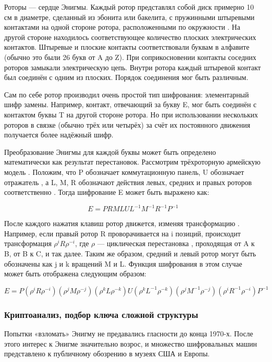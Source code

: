 Роторы — сердце Энигмы. Каждый ротор представлял собой диск примерно 
10 см в диаметре, сделанный из эбонита или бакелита, с пружинными 
штыревыми контактами на одной стороне ротора, расположенными по окружности
. На другой стороне находилось соответствующее количество плоских 
электрических контактов. Штыревые и плоские контакты соответствовали 
буквам в алфавите (обычно это были 26 букв от A до Z). При соприкосновении 
контакты соседних роторов замыкали электрическую цепь. Внутри ротора 
каждый штыревой контакт был соединён с одним из плоских. Порядок соединения 
мог быть различным.

Сам по себе ротор производил очень простой тип шифрования: элементарный 
шифр замены. Например, контакт, отвечающий за букву E, мог быть соединён 
с контактом буквы T на другой стороне ротора. Но при использовании 
нескольких роторов в связке (обычно трёх или четырёх) за счёт их постоянного 
движения получается более надёжный шифр.

Преобразование Энигмы для каждой буквы может быть определено математически 
как результат перестановок. Рассмотрим трёхроторную армейскую модель
. Положим, что P обозначает коммутационную панель, U обозначает отражатель
, а L, M, R обозначают действия левых, средних и правых роторов соответственно
. Тогда шифрование E может быть выражено как:

    $$E = PRMLUL^{-1}M^{-1}R^{-1}P^{-1}$$

После каждого нажатия клавиш ротор движется, изменяя трансформацию
. Например, если правый ротор R проворачивается на i позиций, происходит 
трансформация $\rho^iR\rho^{-i}$, где $\rho$ — циклическая перестановка
, проходящая от A к B, от B к C, и так далее. Таким же образом, средний 
и левый ротор могут быть обозначены как j и k вращений M и L. Функция 
шифрования в этом случае может быть отображена следующим образом:

    $$E = P(\rho^iR\rho^{-i})(\rho^{j}M\rho^{-j})(\rho^{k}L\rho^{-k})U(\rho^kL^{-1}\rho^{-k})(\rho^{j}M^{-1}\rho^{-j})(\rho^{i}R^{-1}\rho^{-i})P^{-1}$$

\subsubsection{Криптоанализ, подбор ключа сложной структуры}

Попытки «взломать» Энигму не предавались гласности до конца 1970-х.
После этого интерес к Энигме значительно возрос, и множество шифровальных 
машин представлено к публичному обозрению в музеях США и Европы.

